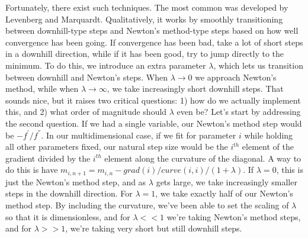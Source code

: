 \documentclass[letterpaper,11pt,preprint]{aastex}
\begin{document}
{Fortunately, there exist such techniques.  The most common was
developed by Levenberg and Marquardt.  Qualitatively, it works by
smoothly transitioning between downhill-type steps and Newton's
method-type steps based on how well convergence has been going.  If
convergence has been bad, take a lot of short steps in a downhill
direction, while if it has been good, try to jump directly to the
minimum.  To do this, we introduce an extra parameter $\lambda$, which
lets us transition between downhill and Newton's steps.  When $\lambda 
\rightarrow 0$ we approach Newton's method, while when $\lambda
\rightarrow \infty$, we take increasingly short downhill steps.   That
sounds nice, but it raises two critical questions:  1) how do we
actually implement this, and 2) what order of magnitude should
$\lambda$ even be?  Let's start by addressing the second question.  If
we had a single variable, our Newton's method step would be
$-f^{'}/f^{''}$.  In our multidimensional case, if we fit for
parameter $i$ while holding all other parameters fixed, our natural
step size would be the $i^{th}$ element of the gradient divided by
the $i^{th}$ element along the curvature of the diagonal.   A way to
do this is have $m_{i,n+1}=m_{i,n}-grad(i)/curve(i,i)/(1+\lambda)$.
If $\lambda=0$, this is just the Newton's method step, and as $\lambda$
gets large, we take increasingly smaller steps in the downhill
direction.  For $\lambda=1$, we take exactly half of our Newton's
method step.  By including the curvature, we've been able to set the
scaling of $\lambda$ so that it is dimensionless, and for $\lambda
<<1$ we're taking Newton's method steps, and for $\lambda>>1$, we're
taking very short but still downhill steps.  

}
\end{document}
